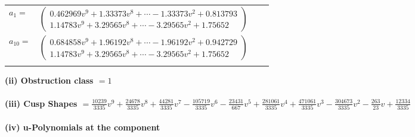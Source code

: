\documentclass[1p]{elsarticle_modified}
\theoremstyle{definition}
\begin{document}
\begin{tabular}{m{7pt} m{180pt} m{7pt} m{180pt} }
\flushright $a_{1}=$&$\begin{pmatrix}0.462969 v^{9}+1.33373 v^{8}+\cdots-1.33373 v^{2}+0.813793\\1.14783 v^{9}+3.29565 v^{8}+\cdots-3.29565 v^{2}+1.75652\end{pmatrix}$ \\
\flushright $a_{10}=$&$\begin{pmatrix}0.684858 v^{9}+1.96192 v^{8}+\cdots-1.96192 v^{2}+0.942729\\1.14783 v^{9}+3.29565 v^{8}+\cdots-3.29565 v^{2}+1.75652\end{pmatrix}$\\&\end{tabular}
\flushleft \textbf{(ii) Obstruction class $= 1$}\\~\\
\flushleft \textbf{(iii) Cusp Shapes $= \frac{10239}{3335} v^9+\frac{24678}{3335} v^8+\frac{44281}{3335} v^7-\frac{105719}{3335} v^6-\frac{23431}{667} v^5+\frac{281061}{3335} v^4+\frac{471061}{3335} v^3-\frac{304673}{3335} v^2-\frac{263}{23} v+\frac{12334}{3335}$}\\~\\
\newpage\renewcommand{\arraystretch}{1}
\flushleft \textbf{(iv) u-Polynomials at the component}\newline \\
\end{document}
